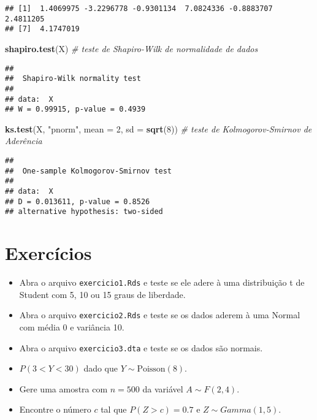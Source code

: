 \documentclass[]{article}
\newenvironment{Shaded}{\begin{snugshade}}{\end{snugshade}}
\newcommand{\KeywordTok}[1]{\textcolor[rgb]{0.13,0.29,0.53}{\textbf{#1}}}
\newcommand{\DataTypeTok}[1]{\textcolor[rgb]{0.13,0.29,0.53}{#1}}
\newcommand{\DecValTok}[1]{\textcolor[rgb]{0.00,0.00,0.81}{#1}}
\newcommand{\StringTok}[1]{\textcolor[rgb]{0.31,0.60,0.02}{#1}}
\newcommand{\CommentTok}[1]{\textcolor[rgb]{0.56,0.35,0.01}{\textit{#1}}}
\newcommand{\NormalTok}[1]{#1}
\providecommand{\tightlist}{%
  \setlength{\itemsep}{0pt}\setlength{\parskip}{0pt}}
\begin{document}
\begin{verbatim}
## [1]  1.4069975 -3.2296778 -0.9301134  7.0824336 -0.8883707  2.4811205
## [7]  4.1747019
\end{verbatim}

\begin{Shaded}
\begin{Highlighting}[]
\KeywordTok{shapiro.test}\NormalTok{(X) }\CommentTok{# teste de Shapiro-Wilk de normalidade de dados}
\end{Highlighting}
\end{Shaded}

\begin{verbatim}
## 
##  Shapiro-Wilk normality test
## 
## data:  X
## W = 0.99915, p-value = 0.4939
\end{verbatim}

\begin{Shaded}
\begin{Highlighting}[]
\KeywordTok{ks.test}\NormalTok{(X, }
        \StringTok{"pnorm"}\NormalTok{, }
        \DataTypeTok{mean =} \DecValTok{2}\NormalTok{, }
        \DataTypeTok{sd =} \KeywordTok{sqrt}\NormalTok{(}\DecValTok{8}\NormalTok{)) }\CommentTok{# teste de Kolmogorov-Smirnov de Aderência}
\end{Highlighting}
\end{Shaded}

\begin{verbatim}
## 
##  One-sample Kolmogorov-Smirnov test
## 
## data:  X
## D = 0.013611, p-value = 0.8526
## alternative hypothesis: two-sided
\end{verbatim}

\section{Exercícios}\label{exercicios}

\begin{itemize}
\tightlist
\item
  Abra o arquivo \texttt{exercicio1.Rds} e teste se ele adere à uma
  distribuição t de Student com 5, 10 ou 15 graus de liberdade.
\item
  Abra o arquivo \texttt{exercicio2.Rds} e teste se os dados aderem à
  uma Normal com média 0 e variância 10.
\item
  Abra o arquivo \texttt{exercicio3.dta} e teste se os dados são
  normais.
\item
  \(P(3 < Y < 30)\) dado que \(Y \sim \text{Poisson}(8)\).
\item
  Gere uma amostra com \(n=500\) da variável \(A \sim F(2, 4)\).
\item
  Encontre o número \(c\) tal que \(P(Z>c) = 0.7\) e
  \(Z \sim Gamma(1, 5)\).
\end{itemize}
\end{document}
